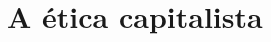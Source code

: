 \documentclass[12pt]{article}
\numberwithin{equation}{section}
\theoremstyle{plain}
\theoremstyle{definition}
\theoremstyle{remark}
\begin{document}




\section{A ética capitalista}
\end{document}

